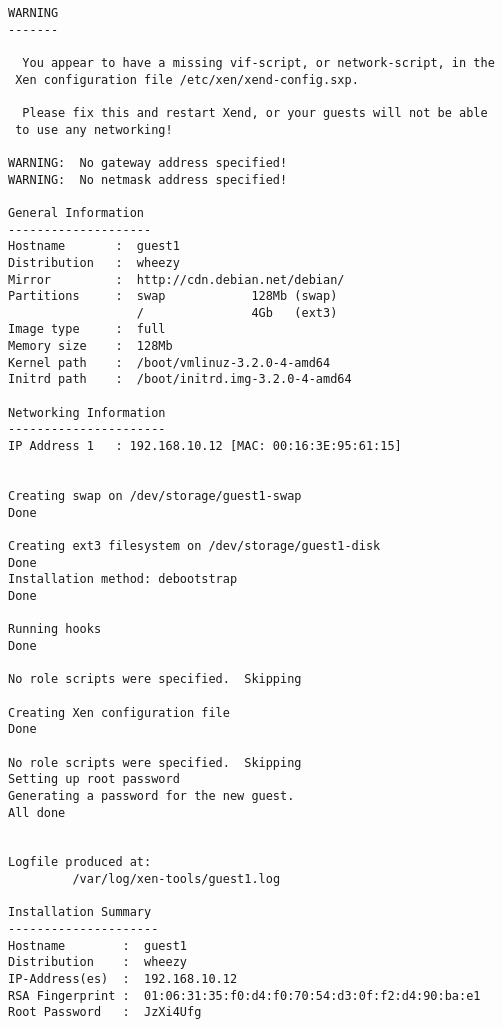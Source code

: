 \begin{verbatim}                                                  
WARNING                                           
-------                                           
                                                  
  You appear to have a missing vif-script, or network-script, in the
 Xen configuration file /etc/xen/xend-config.sxp. 
                                                  
  Please fix this and restart Xend, or your guests will not be able
 to use any networking!                           
                                                  
WARNING:  No gateway address specified!           
WARNING:  No netmask address specified!           
                                                  
General Information                               
--------------------                              
Hostname       :  guest1                          
Distribution   :  wheezy                          
Mirror         :  http://cdn.debian.net/debian/   
Partitions     :  swap            128Mb (swap)    
                  /               4Gb   (ext3)    
Image type     :  full                            
Memory size    :  128Mb                           
Kernel path    :  /boot/vmlinuz-3.2.0-4-amd64     
Initrd path    :  /boot/initrd.img-3.2.0-4-amd64  
                                                  
Networking Information                            
----------------------                            
IP Address 1   : 192.168.10.12 [MAC: 00:16:3E:95:61:15]
                                                  
                                                  
Creating swap on /dev/storage/guest1-swap         
Done                                              
                                                  
Creating ext3 filesystem on /dev/storage/guest1-disk
Done                                              
Installation method: debootstrap
Done

Running hooks
Done

No role scripts were specified.  Skipping

Creating Xen configuration file
Done

No role scripts were specified.  Skipping
Setting up root password
Generating a password for the new guest.
All done


Logfile produced at:
         /var/log/xen-tools/guest1.log

Installation Summary
---------------------
Hostname        :  guest1
Distribution    :  wheezy
IP-Address(es)  :  192.168.10.12 
RSA Fingerprint :  01:06:31:35:f0:d4:f0:70:54:d3:0f:f2:d4:90:ba:e1
Root Password   :  JzXi4Ufg
\end{verbatim}

